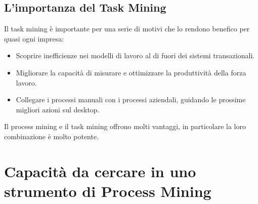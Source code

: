 \documentclass{article}
\begin{document}
\subsection{L'importanza del Task Mining}
Il task mining è importante per una serie di motivi che lo rendono benefico per quasi ogni impresa:
\begin{itemize}
    \item Scoprire inefficienze nei modelli di lavoro al di fuori dei sistemi transazionali.
    \item Migliorare la capacità di misurare e ottimizzare la produttività della forza lavoro.
    \item Collegare i processi manuali con i processi aziendali, guidando le prossime migliori azioni sul desktop.
\end{itemize}
Il process mining e il task mining offrono molti vantaggi, in particolare la loro combinazione è molto potente.

\section{Capacità da cercare in uno strumento di Process Mining}
\end{document}
